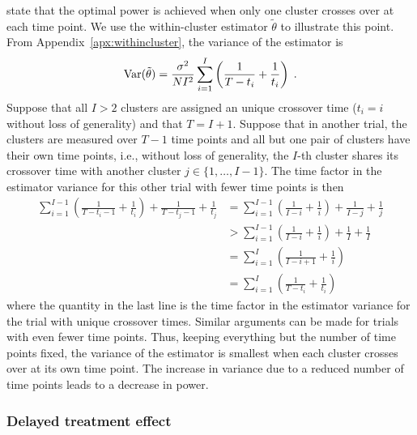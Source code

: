 \documentclass[10pt]{article}
\begin{document}
\textcite{Hussey:2007} state that the optimal power is achieved when only one cluster crosses over at each time point. We use the within-cluster estimator $\tilde{\theta}$ to illustrate this point. From Appendix~\ref{apx:withincluster}, the variance of the estimator is
\[
\mathrm{Var}(\tilde{\theta}) = \frac{\sigma^2}{NI^2}\sum_{i=1}^I\left(\frac{1}{T-t_i} + \frac{1}{t_i}\right) \;.
\]
Suppose that all $I>2$ clusters are assigned an unique crossover time ($t_i=i$ without loss of generality) and that $T=I+1$. Suppose that in another trial, the clusters are measured over $T-1$ time points and all but one pair of clusters have their own time points, i.e., without loss of generality, the $I$-th cluster shares its crossover time with another cluster $j\in\{1,\ldots,I-1\}$. The time factor in the estimator variance for this other trial with fewer time points is then
\begin{align*}
\sum_{i=1}^{I-1}\left(\frac{1}{T-t_i-1} + \frac{1}{t_i}\right) + \frac{1}{T-t_j-1} + \frac{1}{t_j} &= \sum_{i=1}^{I-1}\left(\frac{1}{I-i} + \frac{1}{i}\right) + \frac{1}{I-j} + \frac{1}{j} \\
&> \sum_{i=1}^{I-1}\left(\frac{1}{I-i} + \frac{1}{i}\right) + \frac{1}{I} + \frac{1}{I} \\
&= \sum_{i=1}^I\left(\frac{1}{I-i+1}+\frac{1}{i}\right) \\
&= \sum_{i=1}^I\left(\frac{1}{T-t_i}+\frac{1}{t_i}\right)
\end{align*}
where the quantity in the last line is the time factor in the estimator variance for the trial with unique crossover times. Similar arguments can be made for trials with even fewer time points. Thus, keeping everything but the number of time points fixed, the variance of the estimator is smallest when each cluster crosses over at its own time point. The increase in variance due to a reduced number of time points leads to a decrease in power.

\subsubsection{Delayed treatment effect} \label{apx:delay}
\end{document}
